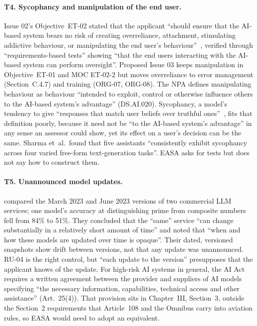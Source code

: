 \documentclass{aer}
\begin{document}
\paragraph{T4. Sycophancy and manipulation of the end user.} Issue 02's Objective~ET-02 stated that the applicant ``should ensure that the AI-based system bears no risk of creating overreliance, attachment, stimulating addictive behaviour, or manipulating the end user's behaviour''~\citep[Section~C.2.4.1]{easa2024concept}, verified through ``requirements-based tests'' showing ``that the end users interacting with the AI-based system can perform oversight''. Proposed Issue 03 keeps manipulation in Objective~ET-01 and MOC ET-02-2 but moves overreliance to error management (Section~C.4.7) and training (ORG-07, ORG-08). The NPA defines manipulating behaviour as behaviour ``intended to exploit, control or otherwise influence others to the AI-based system's advantage'' (DS.AI.020). Sycophancy, a model's tendency to give ``responses that match user beliefs over truthful ones''~\citep{sharma2023sycophancy}, fits that definition poorly, because it need not be ``to the AI-based system's advantage'' in any sense an assessor could show, yet its effect on a user's decision can be the same. Sharma et~al.~found that five assistants ``consistently exhibit sycophancy across four varied free-form text-generation tasks''. EASA asks for tests but does not say how to construct them.

\paragraph{T5. Unannounced model updates.} \citet{chen2023chatgpt} compared the March 2023 and June 2023 versions of two commercial LLM services; one model's accuracy at distinguishing prime from composite numbers fell from 84\% to 51\%. They concluded that the ``same'' service ``can change substantially in a relatively short amount of time'' and noted that ``when and how these models are updated over time is opaque''. Their dated, versioned snapshots show drift between versions, not that any update was unannounced. RU-04 is the right control, but ``each update to the version'' presupposes that the applicant knows of the update. For high-risk AI systems in general, the AI Act requires a written agreement between the provider and suppliers of AI models specifying ``the necessary information, capabilities, technical access and other assistance'' (Art.~25(4)). That provision sits in Chapter~III, Section~3, outside the Section~2 requirements that Article~108 and the Omnibus carry into aviation rules, so EASA would need to adopt an equivalent.
\end{document}

